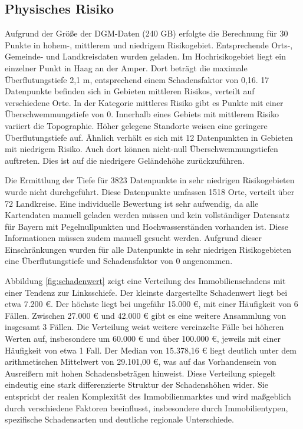 \subsection{Physisches Risiko}
Aufgrund der Größe der \ac{DGM}-Daten (240 GB) erfolgte die Berechnung für 30 Punkte in hohem-, mittlerem und niedrigem Risikogebiet. Entsprechende Orts-, Gemeinde- und Landkreisdaten wurden geladen.
Im Hochrisikogebiet liegt ein einzelner Punkt in Haag an der Amper. Dort beträgt die maximale Überflutungstiefe 2,1 m, entsprechend einem Schadensfaktor von 0,16.
17 Datenpunkte befinden sich in Gebieten mittleren Risikos, verteilt auf verschiedene Orte. In der Kategorie mittleres Risiko gibt es Punkte mit einer Überschwemmungstiefe von 0. Innerhalb eines Gebiets mit mittlerem Risiko variiert die Topographie. Höher gelegene Standorte weisen eine geringere Überflutungstiefe auf. Ähnlich verhält es sich mit 12 Datenpunkten in Gebieten mit niedrigem Risiko. Auch dort können nicht-null Überschwemmungstiefen auftreten. Dies ist auf die niedrigere Geländehöhe zurückzuführen. 

Die Ermittlung der Tiefe für 3823 Datenpunkte in sehr niedrigen Risikogebieten wurde nicht durchgeführt. Diese Datenpunkte umfassen 1518 Orte, verteilt über 72 Landkreise. Eine individuelle Bewertung ist sehr aufwendig, da alle Kartendaten manuell geladen werden müssen und kein vollständiger Datensatz für Bayern mit Pegelnullpunkten und Hochwasserständen vorhanden ist. Diese Informationen müssen zudem manuell gesucht werden. Aufgrund dieser Einschränkungen wurden für alle Datenpunkte in sehr niedrigen Risikogebieten eine Überflutungstiefe und Schadensfaktor von 0 angenommen.

Abbildung \ref{fig:schadenwert} zeigt eine Verteilung des Immobilienschadens mit einer Tendenz zur Linksschiefe. Der kleinste dargestellte Schadenwert liegt bei etwa 7.200 €. Der höchste liegt bei ungefähr 15.000 €, mit einer Häufigkeit von 6 Fällen. Zwischen 27.000 € und 42.000 € gibt es eine weitere Ansammlung von insgesamt 3 Fällen. Die Verteilung weist weitere vereinzelte Fälle bei höheren Werten auf, insbesondere um 60.000 € und über 100.000 €, jeweils mit einer Häufigkeit von etwa 1 Fall.  Der Median von 15.378,16 € liegt deutlich unter dem arithmetischen Mittelwert von 29.101,00 €, was auf das Vorhandensein von Ausreißern mit hohen Schadensbeträgen hinweist. Diese Verteilung spiegelt eindeutig eine stark differenzierte Struktur der Schadenshöhen wider. Sie entspricht der realen Komplexität des Immobilienmarktes und wird maßgeblich durch verschiedene Faktoren beeinflusst, insbesondere durch Immobilientypen, spezifische Schadensarten und deutliche regionale Unterschiede.


